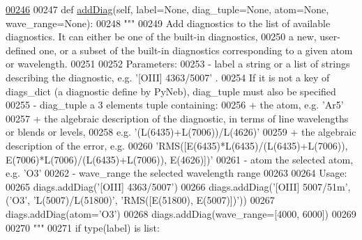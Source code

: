 \begin{DoxyCode}
\hypertarget{classpyneb_1_1core_1_1diags_1_1_diagnostics_l00246}{}\hyperlink{classpyneb_1_1core_1_1diags_1_1_diagnostics_a508fa9c5a2216f9eb4128338c33a6f75}{00246} 
00247     \textcolor{keyword}{def }\hyperlink{classpyneb_1_1core_1_1diags_1_1_diagnostics_a508fa9c5a2216f9eb4128338c33a6f75}{addDiag}(self, label=None, diag\_tuple=None, atom=None, wave\_range=None):
00248         \textcolor{stringliteral}{"""}
00249 \textcolor{stringliteral}{        Add diagnostics to the list of available diagnostics. It can either be one of the built-in
       diagnostics,}
00250 \textcolor{stringliteral}{        a new, user-defined one, or a subset of the built-in diagnostics corresponding to a given atom or
       wavelength.}
00251 \textcolor{stringliteral}{        }
00252 \textcolor{stringliteral}{        Parameters:}
00253 \textcolor{stringliteral}{            - label        a string or a list of strings describing the diagnostic, e.g. '[OIII] 4363/5007'
      . }
00254 \textcolor{stringliteral}{                           If it is not a key of diags\_dict (a diagnostic define by PyNeb), diag\_tuple must
       also be specified}
00255 \textcolor{stringliteral}{            - diag\_tuple   a 3 elements tuple containing:}
00256 \textcolor{stringliteral}{                           + the atom, e.g. 'Ar5'}
00257 \textcolor{stringliteral}{                           + the algebraic description of the diagnostic, in terms of line wavelengths or
       blends or levels, }
00258 \textcolor{stringliteral}{                             e.g. '(L(6435)+L(7006))/L(4626)'}
00259 \textcolor{stringliteral}{                           + the algebraic description of the error, e.g. }
00260 \textcolor{stringliteral}{                             'RMS([E(6435)*L(6435)/(L(6435)+L(7006)), E(7006)*L(7006)/(L(6435)+L(7006)),
       E(4626)])'}
00261 \textcolor{stringliteral}{            - atom         the selected atom, e.g. 'O3'}
00262 \textcolor{stringliteral}{            - wave\_range   the selected wavelength range}
00263 \textcolor{stringliteral}{            }
00264 \textcolor{stringliteral}{        Usage:}
00265 \textcolor{stringliteral}{        diags.addDiag('[OIII] 4363/5007')}
00266 \textcolor{stringliteral}{        diags.addDiag('[OIII] 5007/51m', ('O3', 'L(5007)/L(51800)', 'RMS([E(51800), E(5007)])'))}
00267 \textcolor{stringliteral}{        diags.addDiag(atom='O3')}
00268 \textcolor{stringliteral}{        diags.addDiag(wave\_range=[4000, 6000])}
00269 \textcolor{stringliteral}{}
00270 \textcolor{stringliteral}{        """}
00271         \textcolor{keywordflow}{if} type(label) \textcolor{keywordflow}{is} list:

\end{DoxyCode}
